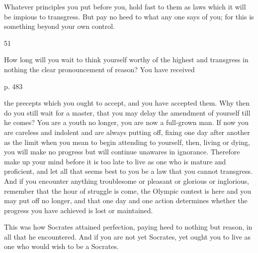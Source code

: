 Whatever principles you put before you, hold fast to them as laws which it will
be impious to transgress. But pay no heed to what any one says of you; for this
is something beyond your own control.

51

How long will you  wait to think yourself worthy of  the highest and transgress
in nothing the clear pronouncement of reason? You have received

p. 483

the precepts which you ought to accept, and you have accepted them. Why then do
you still wait for a master, that  you may delay the amendment of yourself till
he comes? You are  a youth no longer, you are now a  full-grown man. If now you
are careless  and indolent  and are  always putting off,  fixing one  day after
another as the limit when you mean to begin attending to yourself, then, living
or dying,  you will make no  progress but will continue  unawares in ignorance.
Therefore make up your mind before it is  too late to live as one who is mature
and proficient,  and let all that  seems best to you  be a law that  you cannot
transgress. And if  you encounter anything troublesome or  pleasant or glorious
or inglorious, remember that the hour  of struggle is come, the Olympic contest
is  here and  you may  put  off no  longer, and  that  one day  and one  action
determines whether the progress you have achieved is lost or maintained.

This was how  Socrates attained perfection, paying heed to  nothing but reason,
in all that he  encountered. And if you are not yet Socrates,  yet ought you to
live as one who would wish to be a Socrates.
